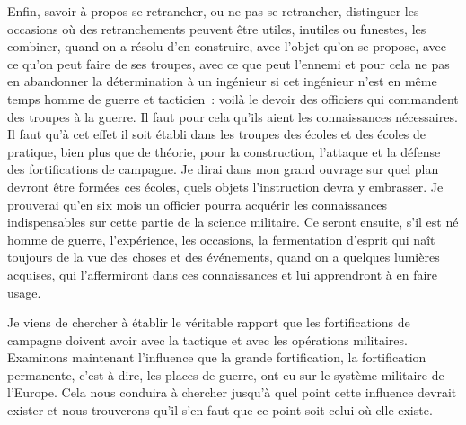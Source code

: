 \documentclass[french,twoside]{book} %
\begin{document}
Enfin, savoir à propos se retrancher, ou ne pas se retrancher, distinguer les occasions où des retranchements peuvent être utiles, inutiles ou funestes, les combiner, quand on a résolu d’en construire, avec l’objet qu’on se propose, avec ce qu’on peut faire de ses troupes, avec ce que peut l’ennemi et pour cela ne pas en abandonner la détermination à un ingénieur si cet ingénieur n’est en même temps homme de guerre et tacticien : voilà le devoir des officiers qui commandent des troupes à la guerre. Il faut pour cela qu’ils aient les connaissances nécessaires. Il faut qu’à cet effet il soit établi dans les troupes des écoles et des écoles de pratique, bien plus que de théorie, pour la construction, l’attaque et la défense des fortifications de campagne. Je dirai dans mon grand ouvrage sur quel plan devront être formées ces écoles, quels objets l’instruction devra y embrasser. Je prouverai qu’en six mois un officier pourra acquérir les connaissances indispensables sur cette partie de la science militaire. Ce seront ensuite, s’il est né homme de guerre, l’expérience, les occasions, la fermentation d’esprit qui naît toujours de la vue des choses et des événements, quand on a quelques lumières acquises, qui l’affermiront dans ces connaissances et lui apprendront à en faire usage.\par
Je viens de chercher à établir le véritable rapport que les fortifications de campagne doivent avoir avec la tactique et avec les opérations militaires. Examinons maintenant l’influence que la grande fortification, la fortification permanente, c’est-à-dire, les places de guerre, ont eu sur le système militaire de l’Europe. Cela nous conduira à chercher jusqu’à quel point cette influence devrait exister et nous trouverons qu’il s’en faut que ce point soit celui où elle existe.\par
\end{document}
